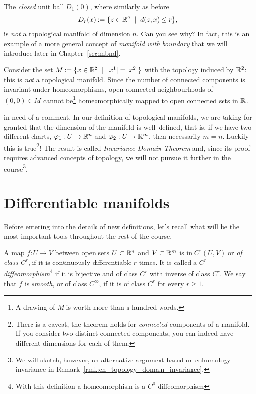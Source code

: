 \begin{example}\label{ex:uball}
  The \emph{closed} unit ball $D_1(0)$, where similarly as before
  \begin{equation}
    D_r(x) := \{z\in\mathbb{R}^n \;\mid\; d(z,x) \leq r\},
  \end{equation}
  is \emph{not} a topological manifold of dimension $n$. Can you see why? In fact, this is an example of a more general concept of \emph{manifold with boundary} that we will introduce later in Chapter~\ref{sec:mbnd}.
\end{example}

\begin{example}
  Consider the set $M := \{ x\in\mathbb{R}^2 \;\mid\; |x^1| = |x^2| \}$ with the topology induced by $\mathbb{R}^2$:
  this is \emph{not} a topological manifold.
  Since the number of connected components is invariant under homeomorphisms, open connected neighbourhoods of $(0,0)\in M$ cannot be\footnote{A drawing of $M$ is worth more than a hundred words.} homeomorphically mapped to open connected sets in $\mathbb{R}$.
\end{example}

 in need of a comment.
In our definition of topological manifolds, we are taking for granted that the dimension of the manifold is well--defined, that is, if we have two different charts, $\varphi_1: U \to \mathbb{R}^n$ and $\varphi_2: U \to \mathbb{R}^m$, then necessarily $m=n$. Luckily this is true\footnote{There is a caveat, the theorem holds for \emph{connected} components of a manifold. If you consider two distinct connected components, you can indeed have different dimensions for each of them.}! The result is called \emph{Invariance Domain Theorem} and, since its proof requires advanced concepts of topology, we will not pursue it further in the course\footnote{We will sketch, however, an alternative argument based on cohomology invariance in Remark~\ref{rmk:ch_topology_domain_invariance}.}.

\section{Differentiable manifolds}

Before entering into the details of new definitions, let's recall what will be the most important tools throughout the rest of the course.

\begin{definition}
  A map $f: U \to V$ between open sets $U\subset\mathbb{R}^n$ and $V\subset\mathbb{R}^m$ is in $C^r(U,V)$ or \emph{of class $C^r$}, if it is continuously differentiable $r$-times.
  It is called a $C^r$-\emph{diffeomorphism}\footnote{With this definition a homeomorphism is a $C^0$-diffeomorphism} if it is bijective and of class $C^r$ with inverse of class $C^r$.
  We say that $f$ is \emph{smooth}, or of class $C^\infty$, if it is of class $C^r$ for every $r \geq 1$.
\end{definition}

